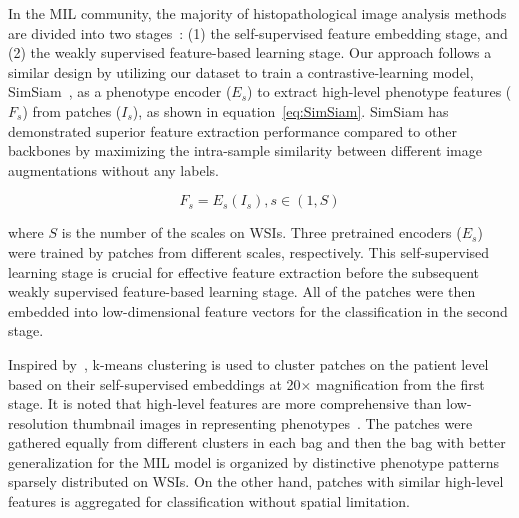\documentclass[times,twocolumn,final]{elsarticle}
\begin{document}
In the MIL community, the majority of histopathological image analysis methods are divided into two stages~\citep{schirris2021deepsmile,dehaene2020self}: (1) the self-supervised feature embedding stage, and (2) the weakly supervised feature-based learning stage. Our approach follows a similar design by utilizing our dataset to train a contrastive-learning model, SimSiam~\citep{chen2021exploring}, as a phenotype encoder ($E_s$) to extract high-level phenotype features ($F_s$) from patches ($I_s$), as shown in equation~\ref{eq:SimSiam}. SimSiam has demonstrated superior feature extraction performance compared to other backbones by maximizing the intra-sample similarity between different image augmentations without any labels. 

\begin{equation}
    F_s = E_s(I_s), s \in (1, S)
\label{eq:SimSiam}
\end{equation}

\noindent where $S$ is the number of the scales on WSIs. Three pretrained encoders ($E_s$) were trained by patches from different scales, respectively. This self-supervised learning stage is crucial for effective feature extraction before the subsequent weakly supervised feature-based learning stage. All of the patches were then embedded into low-dimensional feature vectors for the classification in the second stage.



Inspired by~\citep{yao2020whole}, k-means clustering is used to cluster patches on the patient level based on their self-supervised embeddings at 20$\times$ magnification from the first stage. It is noted that high-level features are more comprehensive than low-resolution thumbnail images in representing phenotypes~\citep{zhu2017wsisa}. The patches were gathered equally from different clusters in each bag and then the bag with better generalization for the MIL model is organized by distinctive phenotype patterns sparsely distributed on WSIs. On the other hand, patches with similar high-level features is aggregated for classification without spatial limitation.  
\end{document}
